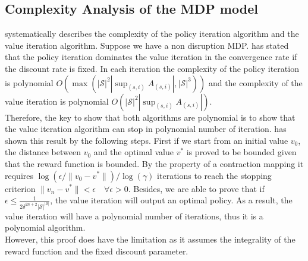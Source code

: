 \documentclass[11pt]{article}
\begin{document}
	\subsection{Complexity Analysis of the MDP model}
		\cite{LDK95} systematically describes the complexity of the policy iteration algorithm and the value iteration algorithm. Suppose we have a non disruption MDP. \cite{P94} has stated that the policy iteration dominates the value iteration in the convergence rate if the discount rate is fixed. In each iteration the complexity of the policy iteration is polynomial \(O(\max(|\mathscr{S}|^2|\sup_{(s,i)} A_{(s,i)}|,|\mathscr{S}|^3))\) and the complexity of the value iteration is polynomial \(O(|\mathscr{S}|^2|\sup_{(s,i)} A_{(s,i)}|)\). \\
		\newline Therefore, the key to show that both algorithms are polynomial is to show that the value iteration algorithm can stop in polynomial number of iteration. \cite{T90} has shown this result by the following steps. First if we start from an initial value \(v_0\), the distance between \(v_0\) and the optimal value \(v^*\) is proved to be bounded given that the reward function is bounded. By the property of a contraction mapping it requires \(\log(\epsilon/\|v_0-v^*\|)/\log(\gamma)\) iterations to reach the stopping criterion \(\|v_n-v^*\|<\epsilon \quad \forall \epsilon>0\). Besides, we are able to prove that if \(\epsilon \leq \frac{1}{2\delta^{2n+2}|\mathscr{S}|^{|\mathscr{S}|}}\), the value iteration will output an optimal policy. As a result, the value iteration will have a polynomial number of iterations, thus it is a polynomial algorithm.\\
		\newline However, this proof does have the limitation as it assumes the integrality of the reward function and the fixed discount parameter.
\end{document}
